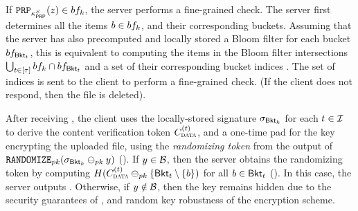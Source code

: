 %


If $\prp{\prpKeyServer}(\genericCInputElmtPRFEval) \in \bloomFilter[\bloomFilterIdx]$, the server performs a fine-grained check. The server first determines all the items $\genericBlocklistElmt \in \bloomFilter[\bloomFilterIdx]$, and their corresponding buckets. Assuming that the server has also precomputed and locally stored a Bloom filter for each bucket $\bloomFilter[\bucket{\bucketIdx}]$, this is equivalent to computing the items in the Bloom filter intersections $\bigcup_{\bucketIdx \in \nats[\numBuckets]} \bloomFilter[\bloomFilterIdx] \cap \bloomFilter[\bucket{\bucketIdx}]$ and a set of their corresponding bucket indices \bucketIDSet. The set of indices is sent to the client to perform a fine-grained check. (If the client does not respond, then the file is deleted). 



After receiving \bucketIDSet, the client uses the locally-stored signature $\genericSig[\bucket{\bloomFilterIdx}]$ for each $t \in \mathcal{I}$ to derive the content verification token 
$\contentToken{\clientData}^{(\bucketIdx)}$, and a one-time pad for the key encrypting the uploaded file, using the \emph{randomizing token} from the output of $\randomize[\pubKey](\genericSig[\bucket{\bloomFilterIdx}] \sigMinus[\pubKey] \genericCInputElmt)$ (). If $\genericCInputElmt \in \blocklist$, then the server obtains the randomizing token by computing $\ro(\contentToken{\clientData}^{(\bucketIdx)} \sigMinus[\pubKey] \{\bucket{\bucketIdx} \setminus \{\genericBlocklistElmt\})$ for all $\genericBlocklistElmt \in \bucket{\bucketIdx}$ (). In this case, the server outputs \clientData. Otherwise, if $\genericCInputElmt \notin \blocklist$, then the key remains hidden due to the security guarantees of \ourSigScheme, and random key robustness of the encryption scheme.  

